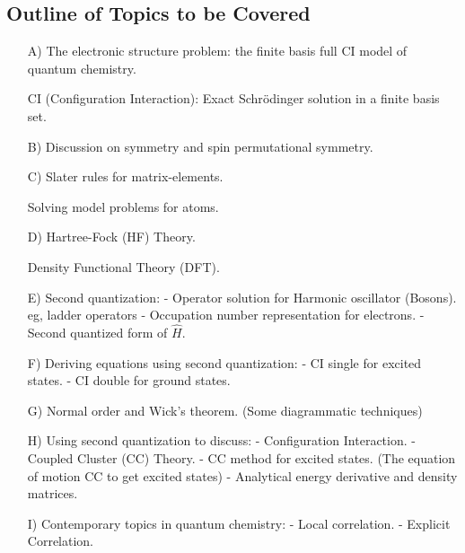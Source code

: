 \documentclass[a4paper, 12pt]{article}
\begin{document}
\subsection{Outline of Topics to be Covered}
\begin{itemize}
    \item[ A)] The electronic structure problem: 
    the finite basis full CI model of quantum chemistry.
    
    CI (Configuration Interaction): Exact Schr{\"o}dinger solution in a finite basis set. 

    \item[ B)] Discussion on symmetry and spin permutational symmetry.
    
    
    \item[ C)] Slater rules for matrix-elements. 
    
    Solving model problems for atoms.
    \item[ D)] Hartree-Fock (HF) Theory.
    
    Density Functional Theory (DFT).
    \item[ E)] Second quantization:\newline
	- Operator solution for Harmonic oscillator (Bosons).
    \indent eg, ladder operators \newline
    - Occupation number representation for electrons.\newline
    - Second quantized form of $\hat{H}$.
    \item[ F)] Deriving equations using second quantization:\newline
    - CI single for excited states.\newline
    - CI double for ground states.
    \item[ G)] Normal order and Wick's theorem. (Some diagrammatic techniques)
    \item[ H)] Using second quantization to discuss:\newline
    - Configuration Interaction.\newline
    - Coupled Cluster (CC) Theory. \newline
    - CC method for excited states. (The equation of motion CC to get excited states)\newline
    - Analytical energy derivative and density matrices.
    \item[ I)] Contemporary topics in quantum chemistry:\newline
    - Local correlation. \newline
    - Explicit Correlation. \newline   
\end{itemize}
\end{document}
